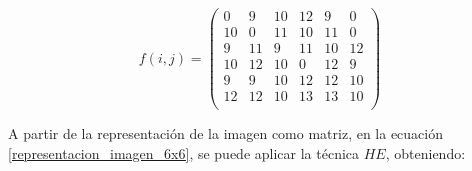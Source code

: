 \begin{equation}
f(i,j) = 
 \begin{pmatrix} 
 0 & 9 & 10 & 12 & 9 & 0 \\
 10 & 0 & 11 & 10 & 11 & 0 \\
 9 & 11 & 9 & 11 & 10 & 12 \\
 10 & 12 & 10 & 0 & 12 & 9 \\
9 & 9 & 10 & 12 & 12 & 10 \\
12 & 12 & 10 & 13 & 13 & 10 \\
\end{pmatrix}
\label{representacion_imagen_6x6}
\end{equation}

A partir de la representación de la imagen como matriz, en la ecuación \ref{representacion_imagen_6x6}, se puede aplicar la técnica $HE$, obteniendo:
